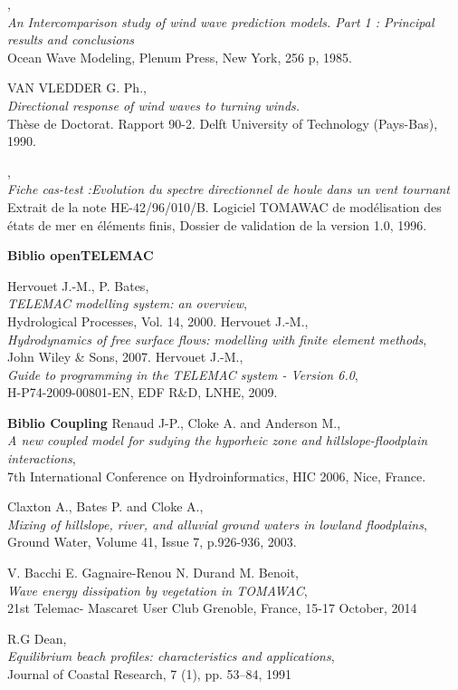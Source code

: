\begin{thebibliography}{99}
 ,\\
 {\em An Intercomparison study of wind wave prediction models. Part 1 : Principal results and conclusions}\\
Ocean Wave Modeling, Plenum Press, New York, 256 p, 1985.  

 {\sc VAN VLEDDER G. Ph.},\\
 {\em Directional response of wind waves to turning winds. }\\
Thèse de Doctorat. Rapport 90-2. Delft University of Technology (Pays-Bas), 1990.

,\\ 
{\em  Fiche cas-test :Evolution du spectre directionnel de houle dans un vent tournant }\\
Extrait de la note HE-42/96/010/B. Logiciel TOMAWAC de mod\'elisation des \'etats de mer en \'el\'ements finis, Dossier de validation de la version 1.0, 1996.  

\vspace{0.5cm}
{\bf Biblio openTELEMAC}

  {\sc Hervouet J.-M., P. Bates},\\
 {\em TELEMAC modelling system: an overview},\\
Hydrological Processes, Vol. 14, 2000.
% 
  {\sc Hervouet J.-M.},\\
 {\em Hydrodynamics of free surface flows: modelling with finite element methods},\\
John Wiley \& Sons, 2007.
% 
  {\sc Hervouet J.-M.},\\
 {\em Guide to programming in the TELEMAC system - Version 6.0},\\
H-P74-2009-00801-EN, EDF R\&D, LNHE, 2009.

\vspace{0.5cm} {\bf Biblio Coupling}
% 
  {\sc Renaud J-P., Cloke A. and Anderson M.},\\
 {\em A new coupled model for sudying the hyporheic zone and hillslope-floodplain interactions},\\
7th International Conference on Hydroinformatics, HIC 2006, Nice, France.

  {\sc Claxton A., Bates P. and Cloke A.},\\
 {\em Mixing of hillslope, river, and alluvial ground waters in lowland floodplains},\\
Ground Water, Volume 41, Issue 7, p.926-936, 2003.

  {\sc V. Bacchi  E. Gagnaire-Renou N. Durand M. Benoit},\\
 {\em Wave energy dissipation by vegetation in TOMAWAC},\\
21st Telemac- Mascaret User Club Grenoble, France, 15-17 October, 2014

 {\sc R.G Dean},\\
 {\em Equilibrium beach profiles: characteristics and applications},\\
Journal of Coastal Research, 7 (1), pp. 53–84, 1991
% 
\end{thebibliography}
